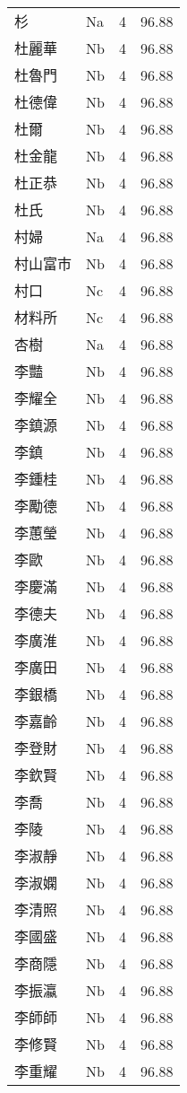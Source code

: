 \documentclass[twocolumn]{book}
\begin{document}
\begin{supertabular}{llrr}
杉 & Na & 4 &  96.88\\
杜麗華 & Nb & 4 &  96.88\\
杜魯門 & Nb & 4 &  96.88\\
杜德偉 & Nb & 4 &  96.88\\
杜爾 & Nb & 4 &  96.88\\
杜金龍 & Nb & 4 &  96.88\\
杜正恭 & Nb & 4 &  96.88\\
杜氏 & Nb & 4 &  96.88\\
村婦 & Na & 4 &  96.88\\
村山富市 & Nb & 4 &  96.88\\
村口 & Nc & 4 &  96.88\\
材料所 & Nc & 4 &  96.88\\
杏樹 & Na & 4 &  96.88\\
李豔 & Nb & 4 &  96.88\\
李耀全 & Nb & 4 &  96.88\\
李鎮源 & Nb & 4 &  96.88\\
李鎮 & Nb & 4 &  96.88\\
李鍾桂 & Nb & 4 &  96.88\\
李勵德 & Nb & 4 &  96.88\\
李蕙瑩 & Nb & 4 &  96.88\\
李歐 & Nb & 4 &  96.88\\
李慶滿 & Nb & 4 &  96.88\\
李德夫 & Nb & 4 &  96.88\\
李廣淮 & Nb & 4 &  96.88\\
李廣田 & Nb & 4 &  96.88\\
李銀橋 & Nb & 4 &  96.88\\
李嘉齡 & Nb & 4 &  96.88\\
李登財 & Nb & 4 &  96.88\\
李欽賢 & Nb & 4 &  96.88\\
李喬 & Nb & 4 &  96.88\\
李陵 & Nb & 4 &  96.88\\
李淑靜 & Nb & 4 &  96.88\\
李淑嫻 & Nb & 4 &  96.88\\
李清照 & Nb & 4 &  96.88\\
李國盛 & Nb & 4 &  96.88\\
李商隱 & Nb & 4 &  96.88\\
李振瀛 & Nb & 4 &  96.88\\
李師師 & Nb & 4 &  96.88\\
李修賢 & Nb & 4 &  96.88\\
李重耀 & Nb & 4 &  96.88\\

\end{supertabular}
\end{document}
